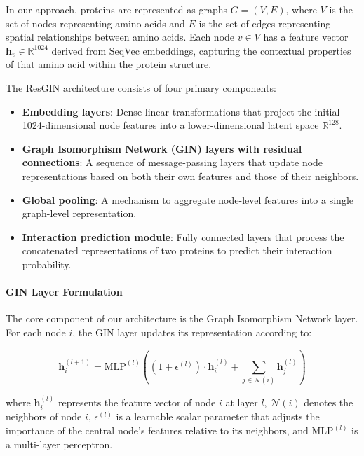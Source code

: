 \documentclass[conference]{IEEEtran}
\begin{document}
In our approach, proteins are represented as graphs $G = (V, E)$, where $V$ is the set of nodes representing amino acids and $E$ is the set of edges representing spatial relationships between amino acids. Each node $v \in V$ has a feature vector $\mathbf{h}_v \in \mathbb{R}^{1024}$ derived from SeqVec embeddings, capturing the contextual properties of that amino acid within the protein structure.

The ResGIN architecture consists of four primary components:

\begin{itemize}
    \item \textbf{Embedding layers}: Dense linear transformations that project the initial 1024-dimensional node features into a lower-dimensional latent space $\mathbb{R}^{128}$.
    
    \item \textbf{Graph Isomorphism Network (GIN) layers with residual connections}: A sequence of message-passing layers that update node representations based on both their own features and those of their neighbors.
    
    \item \textbf{Global pooling}: A mechanism to aggregate node-level features into a single graph-level representation.
    
    \item \textbf{Interaction prediction module}: Fully connected layers that process the concatenated representations of two proteins to predict their interaction probability.
\end{itemize}

\paragraph{GIN Layer Formulation}
The core component of our architecture is the Graph Isomorphism Network layer. For each node $i$, the GIN layer updates its representation according to:

\begin{equation}
\mathbf{h}_i^{(l+1)} = \text{MLP}^{(l)}\left((1 + \epsilon^{(l)}) \cdot \mathbf{h}_i^{(l)} + \sum_{j \in \mathcal{N}(i)} \mathbf{h}_j^{(l)}\right)
\end{equation}

where $\mathbf{h}_i^{(l)}$ represents the feature vector of node $i$ at layer $l$, $\mathcal{N}(i)$ denotes the neighbors of node $i$, $\epsilon^{(l)}$ is a learnable scalar parameter that adjusts the importance of the central node's features relative to its neighbors, and $\text{MLP}^{(l)}$ is a multi-layer perceptron.
\end{document}
